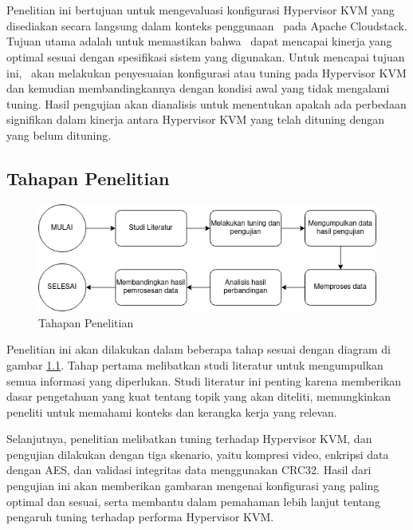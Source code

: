 \chapter{\babTiga}
Penelitian ini bertujuan untuk mengevaluasi konfigurasi Hypervisor KVM yang disediakan secara langsung dalam konteks penggunaan \vm\ pada Apache Cloudstack. Tujuan utama adalah untuk memastikan bahwa \vm\ dapat mencapai kinerja yang optimal sesuai dengan spesifikasi sistem yang digunakan. Untuk mencapai tujuan ini, \saya\ akan melakukan penyesuaian konfigurasi atau tuning pada Hypervisor KVM dan kemudian membandingkannya dengan kondisi awal yang tidak mengalami tuning. Hasil pengujian akan dianalisis untuk menentukan apakah ada perbedaan signifikan dalam kinerja antara Hypervisor KVM yang telah dituning dengan yang belum dituning.

\section{Tahapan Penelitian}
\begin{figure}
    \centering
    \includegraphics[width=1\textwidth]
    {assets/pics/tahapan-penelitian.png}
    \caption{Tahapan Penelitian}
    \label{fig:TahapanPenelitian}
\end{figure}

Penelitian ini akan dilakukan dalam beberapa tahap sesuai dengan diagram di gambar \ref{fig:TahapanPenelitian}. Tahap pertama melibatkan studi literatur untuk mengumpulkan semua informasi yang diperlukan. Studi literatur ini penting karena memberikan dasar pengetahuan yang kuat tentang topik yang akan diteliti, memungkinkan peneliti untuk memahami konteks dan kerangka kerja yang relevan. 

Selanjutnya, penelitian melibatkan tuning terhadap Hypervisor KVM, dan pengujian dilakukan dengan tiga skenario, yaitu kompresi video, enkripsi data dengan AES, dan validasi integritas data menggunakan CRC32. Hasil dari pengujian ini akan memberikan gambaran mengenai konfigurasi yang paling optimal dan sesuai, serta membantu dalam pemahaman lebih lanjut tentang pengaruh tuning terhadap performa Hypervisor KVM.

